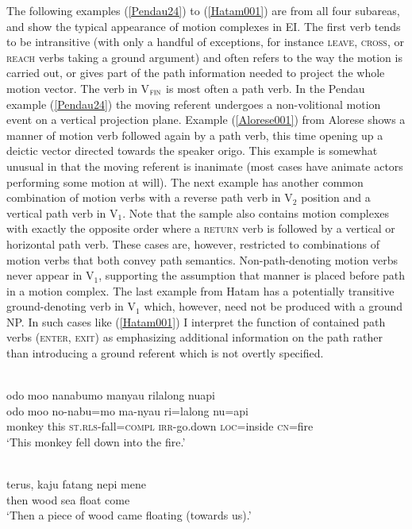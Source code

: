 The following examples (\ref{Pendau24}) to (\ref{Hatam001}) are from all four subareas, and show the typical appearance of motion complexes in EI. The first verb tends to be intransitive (with only a handful of exceptions, for instance \textsc{leave}, \textsc{cross}, or \textsc{reach} verbs taking a ground argument) and often refers to the way the motion is carried out, or gives part of the path information needed to project the whole motion vector. The verb in V$_{\textsc{fin}}$ is most often a path verb. In the Pendau example (\ref{Pendau24}) the moving referent undergoes a non-volitional motion event on a vertical projection plane. Example (\ref{Alorese001}) from Alorese shows a manner of motion verb followed again by a path verb, this time opening up a deictic vector directed towards the speaker origo. This example is somewhat unusual in that the moving referent is inanimate (most cases have animate actors performing some motion at will). The next example has another common combination of motion verbs with a reverse path verb in V$_{2}$ position and a vertical path verb in V$_{1}$. Note that the sample also contains motion complexes with exactly the opposite order where a \textsc{return} verb is followed by a vertical or horizontal path verb. These cases are, however, restricted to combinations of motion verbs that both convey path semantics. Non-path-denoting motion verbs never appear in V$_1$, supporting the assumption that manner is placed before path in a motion complex. The last example from Hatam has a potentially transitive ground-denoting verb in V$_{1}$ which, however, need not be produced with a ground NP. In such cases like (\ref{Hatam001}) I interpret the function of contained path verbs (\textsc{enter}, \textsc{exit}) as emphasizing additional information on the path rather than introducing a ground referent which is not overtly specified.

\ea \label{Pendau24}
\\
\glll odo moo nanabumo manyau rilalong nuapi \\
odo moo no-nabu=mo ma-nyau ri=lalong nu=api \\
monkey this \textsc{st}.\textsc{rls}-fall=\textsc{compl} \textsc{irr}-go.down \textsc{loc}=inside \textsc{cn}=fire \\
\glft `This monkey fell down into the fire.' \\ 
\z

\ea \label{Alorese001}
\\
\gll terus, kaju fatang nepi mene \\
then wood sea float come \\
\glft `Then a piece of wood came floating (towards us).'\\ 
\z

